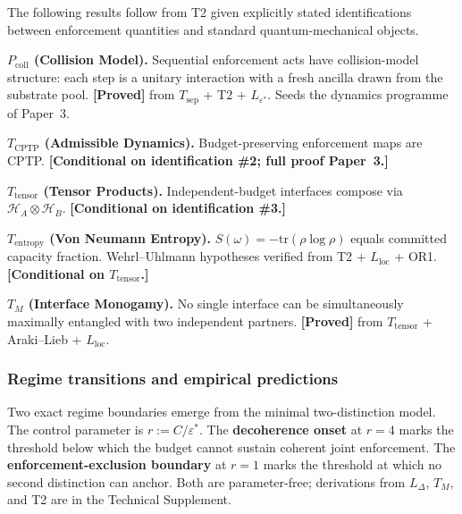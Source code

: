 \documentclass[11pt]{article}
\theoremstyle{remark}
\begin{document}
\noindent The following results follow from T2 given explicitly stated identifications between enforcement quantities and standard quantum-mechanical objects.

\begin{tcolorbox}[apfbox, title={Conditional Theorems: $P_{\mathrm{coll}}$, $T_{\mathrm{CPTP}}$, $T_{\mathrm{tensor}}$, $T_{\mathrm{entropy}}$, $T_M$}]
\label{sec:collision_model}
\textbf{$P_{\mathrm{coll}}$ (Collision Model).}  Sequential enforcement acts have collision-model structure: each step is a unitary interaction with a fresh ancilla drawn from the substrate pool.  \textbf{[Proved]} from $T_{\mathrm{sep}}$ + T2 + $L_{\varepsilon^*}$.  Seeds the dynamics programme of Paper~3.

\smallskip\noindent\textbf{$T_{\mathrm{CPTP}}$ (Admissible Dynamics).}  Budget-preserving enforcement maps are CPTP.  \textbf{[Conditional on identification \#2; full proof Paper~3.]}

\smallskip\noindent\textbf{$T_{\mathrm{tensor}}$ (Tensor Products).}  Independent-budget interfaces compose via $\mathcal{H}_A \otimes \mathcal{H}_B$.  \textbf{[Conditional on identification \#3.]}

\smallskip\noindent\textbf{$T_{\mathrm{entropy}}$ (Von Neumann Entropy).}  $S(\omega) = -\mathrm{tr}(\rho\log\rho)$ equals committed capacity fraction.  Wehrl--Uhlmann hypotheses verified from T2 + $L_{\mathrm{loc}}$ + OR1.  \textbf{[Conditional on $T_{\mathrm{tensor}}$.]}

\smallskip\noindent\textbf{$T_M$ (Interface Monogamy).}  No single interface can be simultaneously maximally entangled with two independent partners.  \textbf{[Proved]} from $T_{\mathrm{tensor}}$ + Araki--Lieb + $L_{\mathrm{loc}}$.
\end{tcolorbox}


\subsubsection*{Regime transitions and empirical predictions}
\label{sec:regime_models_full}\label{box:regime_experimental}\label{box:operationalize_r}

\noindent Two exact regime boundaries emerge from the minimal two-distinction model.  The control parameter is $r := C/\varepsilon^*$.  The \textbf{decoherence onset} at $r = 4$ marks the threshold below which the budget cannot sustain coherent joint enforcement.  The \textbf{enforcement-exclusion boundary} at $r = 1$ marks the threshold at which no second distinction can anchor.  Both are parameter-free; derivations from $L_\Delta$, $T_M$, and T2 are in the Technical Supplement.
\end{document}
